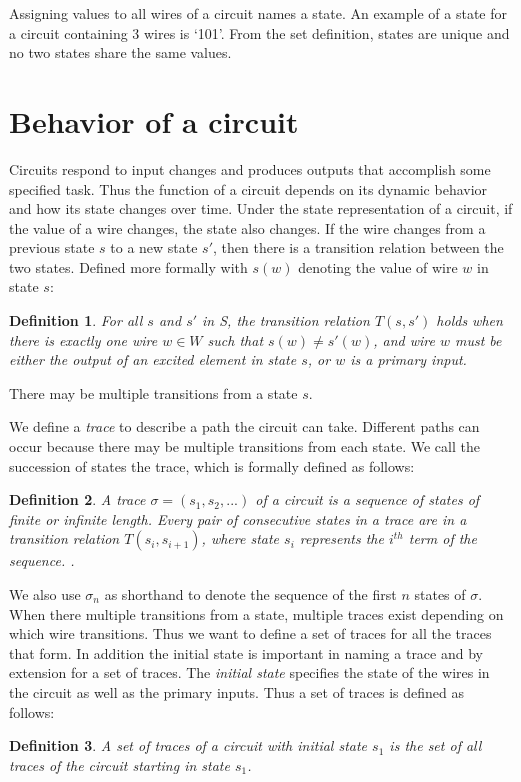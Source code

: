 \documentclass[12pt]{report}
\newtheorem*{definition}{Definition}
\begin{document}
Assigning values to all wires of a circuit names a state.  An example of a state for a circuit containing 3 wires is `101'.  From the set definition, states are unique and no two states share the same values.

\section{Behavior of a circuit}    
Circuits respond to input changes and produces outputs that accomplish some specified task.  Thus the function of a circuit depends on its dynamic behavior and how its state changes over time.  Under the state representation of a circuit, if the value of a wire changes, the state also changes.  If the wire changes from a previous state $s$ to a new state $s'$, then there is a transition relation between the two states.  Defined more formally with $s(w)$ denoting the value of wire $w$ in state $s$:  
\begin{definition}
For all $s$ and $s'$ in S, the \emph{transition relation} $T(s,s')$ holds when there is exactly one wire $w \in W$ such that $s(w)\neq s'(w)$, and wire $w$ must be either the output of an excited element in state $s$, or $w$ is a primary input.
\end{definition}
There may be multiple transitions from a state $s$.


We define a {\em trace} to describe a path the circuit can take.  Different paths can occur because there may be multiple transitions from each state.  We call the succession of states the trace, which is formally defined as follows:
\begin{definition}A {\em trace} $\sigma=(s_1, s_2, ...)$ of a circuit is a sequence of states of finite or infinite length.  
 Every pair of consecutive states in a trace are in a transition relation $T(s_i,s_{i+1})$, where state $s_i$ represents the $i^{th}$ term of the sequence.  .  %
\end{definition} 
We also use $\sigma_n$ as shorthand to denote the sequence of the first $n$ states of $\sigma$.
When there multiple transitions from a state, multiple traces exist depending on which wire transitions.  Thus we want to define a set of traces for all the traces that form.  In addition the initial state is important in naming a trace and by extension for a set of traces.  The {\em initial state} specifies the state of the wires in the circuit as well as the primary inputs.  Thus a set of traces is defined as follows:
\begin{definition}
A {\em set of traces} of a circuit with initial state $s_1$ is the set of all traces of the circuit starting in state $s_1$. 
\end{definition} 
\end{document}
